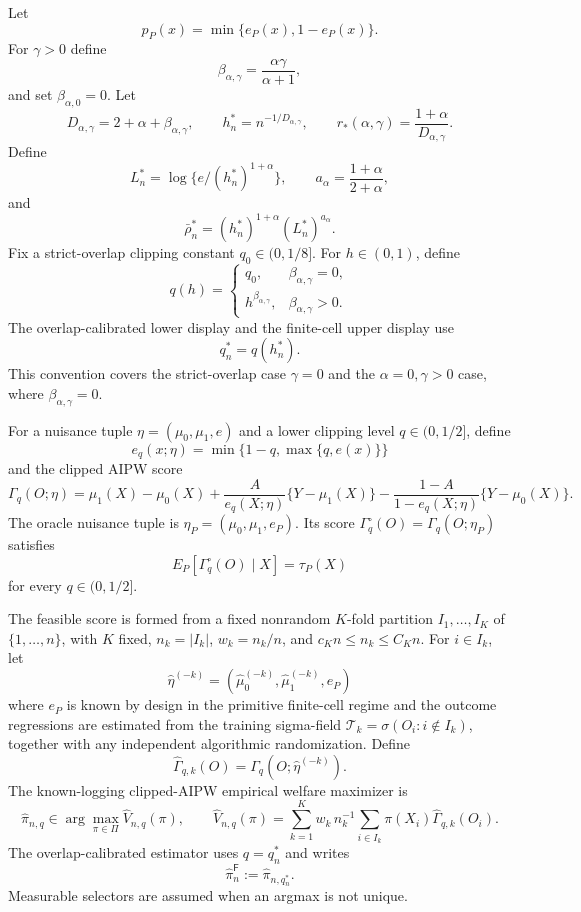 \documentclass[11pt]{article}
\theoremstyle{definition}
\theoremstyle{plain}
\theoremstyle{remark}
\begin{document}
Let
\[
p_P(x)=\min\{e_P(x),1-e_P(x)\}.
\]
For \(\gamma>0\) define
\[
\beta_{\alpha,\gamma}=\frac{\alpha\gamma}{\alpha+1},
\]
and set \(\beta_{\alpha,0}=0\).  Let
\[
D_{\alpha,\gamma}=2+\alpha+\beta_{\alpha,\gamma},\qquad
h_n^*=n^{-1/D_{\alpha,\gamma}},\qquad
r_*(\alpha,\gamma)=\frac{1+\alpha}{D_{\alpha,\gamma}}.
\]
Define
\[
L_n^*=\log\{e/(h_n^*)^{1+\alpha}\},\qquad
a_\alpha=\frac{1+\alpha}{2+\alpha},
\]
and
\[
\bar\rho_n^*=(h_n^*)^{1+\alpha}(L_n^*)^{a_\alpha}.
\]
Fix a strict-overlap clipping constant \(q_0\in(0,1/8]\).  For
\(h\in(0,1)\), define
\[
q(h)=
\begin{cases}
q_0, & \beta_{\alpha,\gamma}=0,\\
h^{\beta_{\alpha,\gamma}}, & \beta_{\alpha,\gamma}>0.
\end{cases}
\]
The overlap-calibrated lower display and the finite-cell upper display use
\[
q_n^*=q(h_n^*).
\]
This convention covers the strict-overlap case \(\gamma=0\) and the
\(\alpha=0,\gamma>0\) case, where \(\beta_{\alpha,\gamma}=0\).

For a nuisance tuple \(\eta=(\mu_0,\mu_1,e)\) and a lower clipping level
\(q\in(0,1/2]\), define
\[
e_q(x;\eta)=\min\{1-q,\max\{q,e(x)\}\}
\]
and the clipped AIPW score
\[
\Gamma_q(O;\eta)=\mu_1(X)-\mu_0(X)
+\frac{A}{e_q(X;\eta)}\{Y-\mu_1(X)\}
-\frac{1-A}{1-e_q(X;\eta)}\{Y-\mu_0(X)\}.
\]
The oracle nuisance tuple is \(\eta_P=(\mu_0,\mu_1,e_P)\).  Its score
\(\Gamma_q^\circ(O)=\Gamma_q(O;\eta_P)\) satisfies
\[
E_P[\Gamma_q^\circ(O)\mid X]=\tau_P(X)
\]
for every \(q\in(0,1/2]\).

The feasible score is formed from a fixed nonrandom \(K\)-fold partition
\(I_1,\ldots,I_K\) of \(\{1,\ldots,n\}\), with \(K\) fixed,
\(n_k=|I_k|\), \(w_k=n_k/n\), and \(c_Kn\le n_k\le C_Kn\).  For
\(i\in I_k\), let
\[
\widehat\eta^{(-k)}=(\widehat\mu_0^{(-k)},\widehat\mu_1^{(-k)},e_P)
\]
where \(e_P\) is known by design in the primitive finite-cell regime and the
outcome regressions are estimated from the training sigma-field
\(\mathcal T_k=\sigma(O_i:i\notin I_k)\), together with any independent
algorithmic randomization.  Define
\[
\widehat\Gamma_{q,k}(O)=\Gamma_q(O;\widehat\eta^{(-k)}).
\]
The known-logging clipped-AIPW empirical welfare maximizer is
\[
\widehat\pi_{n,q}\in\arg\max_{\pi\in\Pi}
\widehat V_{n,q}(\pi),\qquad
\widehat V_{n,q}(\pi)=
\sum_{k=1}^K w_k\, n_k^{-1}\sum_{i\in I_k}
\pi(X_i)\widehat\Gamma_{q,k}(O_i).
\]
The overlap-calibrated estimator uses \(q=q_n^*\) and writes
\[
\widehat\pi_{n}^{\mathsf F}:=\widehat\pi_{n,q_n^*}.
\]
Measurable selectors are assumed when an argmax is not unique.
\end{document}
